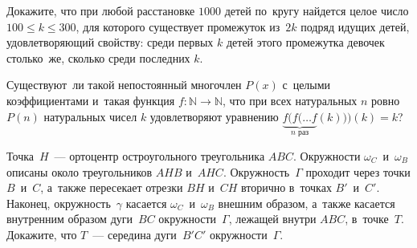 



\begin{problems}

\item
Докажите, что при любой расстановке $1000$ детей по~кругу найдется целое число
$100 \leq k \leq 300$, для которого существует промежуток из~$2k$ подряд идущих
детей, удовлетворяющий свойству: среди первых $k$ детей этого промежутка
девочек столько~же, сколько среди последних $k$.

\item
Существуют~ли такой непостоянный многочлен $P(x)$ с~целыми коэффициентами
и~такая функция $f \colon \mathbb{N} \to \mathbb{N}$, что при всех натуральных
$n$ ровно $P(n)$ натуральных чисел $k$ удовлетворяют уравнению
$\underbrace{f (f (\ldots f}_{\text{$n$ раз}}(k))) (k) = k$?

\item
Точка~$H$~--- ортоцентр остроугольного треугольника $ABC$.
Окружности $\omega_C$~и~$\omega_B$ описаны около треугольников $AHB$ и~$AHC$.
Окружность~$\Gamma$ проходит через точки $B$~и~$C$, а~также пересекает отрезки
$BH$ и~$CH$ вторично в~точках $B'$~и~$C'$.
Наконец, окружность~$\gamma$ касается $\omega_C$~и~$\omega_B$ внешним образом,
а~также касается внутренним образом дуги~$BC$ окружности~$\Gamma$, лежащей
внутри $ABC$, в~точке~$T$.
Докажите, что $T$~--- середина дуги~$B'C'$ окружности~$\Gamma$.

\end{problems}

